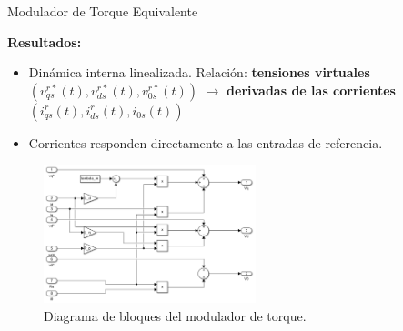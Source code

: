 \documentclass[12pt]{beamer}
\begin{document}
\begin{frame}{Modulador de Torque Equivalente} \small

\textbf{Resultados:}
\begin{itemize} \footnotesize
    \item Dinámica interna linealizada. Relación: \textbf{tensiones virtuales} \((v_{qs}^{r*}(t), v_{ds}^{r*}(t), v_{0s}^{r*}(t))\) $\rightarrow$ \textbf{derivadas de las corrientes} \((i_{qs}^r(t), i_{ds}^r(t), i_{0s}(t))\)
    \item Corrientes responden directamente a las entradas de referencia.
\end{itemize}

\begin{figure}[h]
    \centering
    \includegraphics[width=0.55\textwidth]{Imagenes/modulador_torque_desacople_realimentaciones.png}
    \caption{Diagrama de bloques del modulador de torque.}
\end{figure}
\end{frame}
\end{document}
